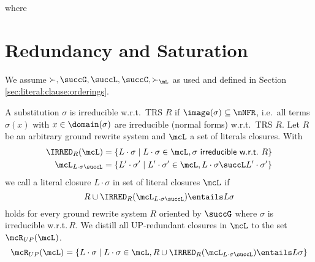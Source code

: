
\begin{definition}

where

\end{definition}

\section{Redundancy and Saturation}
    We assume \( \succ, \succG, \succL, \succC, \succ_\mL \)
    as used and defined in
    Section \vref{sec:literal:clause:orderings}.

\begin{definition}
    A substitution \( \sigma \) is irreducible w.r.t.~TRS \( R \)
    if
    \( \image(\sigma)\subseteq\mNFR \),
    i.e.~all terms \(\sigma(x)\) with
    \( x\in\domain(\sigma) \) are irreducible (normal forms) w.r.t.~TRS \(R\).
    Let \( R \) be an arbitrary ground rewrite system
    and \( \mcL \) a set of literals closures.
    With
    \begin{align*}
        \IRRED_R(\mcL) &= \{ L\cdot\sigma \mid L\cdot\sigma\in\mcL,
        \sigma\textsf{ irreducible w.r.t.~}R \}
    \\
        \mcL_{L\cdot\sigma\succL} &= \{
            L'\cdot\sigma'\mid L'\cdot\sigma'\in\mcL, L\cdot\sigma\succL L'\cdot\sigma'
            \}
    \end{align*}
    we call a literal closure \( L\cdot\sigma \) 
    in set of literal closures \( \mcL \)
    if
    \[
        R \cup \IRRED_R(\mcL_{L\cdot\sigma\succL}) \entails L\sigma
    \]
    holds for every ground rewrite system \( R \) oriented by \( \succG \)
    where \( \sigma \) is irreducible w.r.t.\,\( R \).
    We distill all UP-redundant closures in \( \mcL \) to the set
    \( \mcR_{UP}(\mcL) \).
    \[
        \mcR_{UP}(\mcL) = \{
            L\cdot\sigma
            \mid
            L\cdot\sigma \in \mcL,
            R \cup \IRRED_R(\mcL_{L\cdot\sigma\succL}) \entails L\sigma
        \}
    \]

\end{definition}

